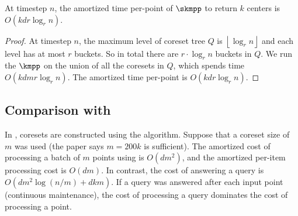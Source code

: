 {%
\begin{lemma}
At timestep $n$, the amortized time per-point of $\skmpp$ to return $k$ centers is $O(kdr\log_r n)$.
\end{lemma}
\begin{proof}
At timestep $n$, the maximum level of coreset tree $Q$ is $\left\lfloor \log_r n \right\rfloor$ and each level has at most $r$ buckets. So in total there are $r\cdot \log_r n$ buckets in $Q$. 
We run the $\kmpp$ on the union of all the coresets in $Q$, which spends time $O(kdmr\log_r n)$. The amortized time per-point is $O(kdr\log_r n)$.
\end{proof}

\subsection{Comparison with \skmpp}
In \skmpp\cite{AMR+12}, coresets are constructed using the \kmpp algorithm. Suppose that a coreset size of $m$ was used (the paper says $m=200k$ is sufficient). The amortized cost of processing a batch of $m$ points using \skmpp is $O(dm^2)$, and the amortized per-item processing cost is $O(dm)$. In contrast, the cost of answering a query is $O(dm^2 \log(n/m) + dkm)$. If a query was answered after each input point (continuous maintenance), the cost of processing a query dominates the cost of processing a point. 


}
